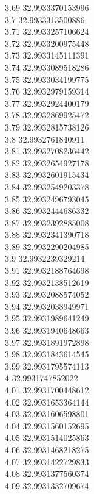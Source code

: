 {3.69	32.9933370153996\\
3.7	32.9933313500886\\
3.71	32.9933257106624\\
3.72	32.9933200975448\\
3.73	32.9933145111391\\
3.74	32.9933089518286\\
3.75	32.9933034199775\\
3.76	32.9932979159314\\
3.77	32.9932924400179\\
3.78	32.9932869925472\\
3.79	32.9932815738126\\
3.8	32.9932761840911\\
3.81	32.9932708236442\\
3.82	32.9932654927178\\
3.83	32.9932601915434\\
3.84	32.9932549203378\\
3.85	32.9932496793045\\
3.86	32.9932444686332\\
3.87	32.9932392885008\\
3.88	32.9932341390718\\
3.89	32.9932290204985\\
3.9	32.9932239329214\\
3.91	32.9932188764698\\
3.92	32.9932138512619\\
3.93	32.9932088574052\\
3.94	32.9932038949971\\
3.95	32.9931989641249\\
3.96	32.9931940648663\\
3.97	32.9931891972898\\
3.98	32.9931843614545\\
3.99	32.9931795574113\\
4	32.9931747852022\\
4.01	32.9931700448612\\
4.02	32.9931653364144\\
4.03	32.9931606598801\\
4.04	32.9931560152695\\
4.05	32.9931514025863\\
4.06	32.9931468218275\\
4.07	32.9931422729833\\
4.08	32.9931377560374\\
4.09	32.9931332709674\\
}
